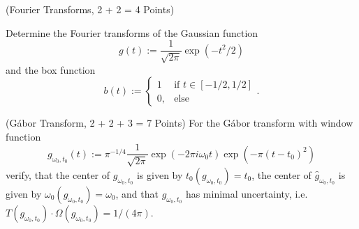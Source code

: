 \documentclass[11pt]{article}
\begin{document}






\begin{exercise}(Fourier Transforms, 2 + 2 = 4 Points)

Determine the Fourier transforms of the Gaussian function
$$
g(t):=\frac{1}{\sqrt{2\pi}}\exp(-t^2/2)
$$
and the box function
$$
b(t):=\left\{\begin{array}{ll} 1& \mbox{if }t\in[-1/2,1/2]\\ 0, & \mbox{else} \end{array}\right..
$$
\end{exercise}

\begin{exercise}(G\'abor Transform, 2 + 2 + 3 = 7 Points)
For the G\'abor transform with window function
$$
g_{\omega_0,t_0}(t):=\pi^{-1/4}\frac{1}{\sqrt{2\pi}}\exp(-2\pi i\omega_0 t)\exp(-\pi(t-t_0)^2)
$$
verify, that the center of $g_{\omega_0,t_0}$ is given by $t_0(g_{\omega_0,t_0})=t_0$, the center of $\hat{g}_{\omega_0,t_0}$ is given by $\omega_0(g_{\omega_0,t_0})=\omega_0$, and that $g_{\omega_0,t_0}$ has minimal uncertainty, i.e.~$T(g_{\omega_0,t_0})\cdot\Omega(g_{\omega_0,t_0})=1/(4\pi)$.
\end{exercise}
\end{document}
